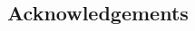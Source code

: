 \documentclass[a0,portrait]{a0poster}
\begin{document}
\begin{multicols}{2}
	\nocite{*} %


	\section*{Acknowledgements}


\end{multicols}
\end{document}
